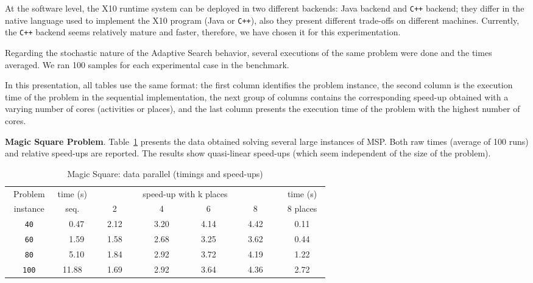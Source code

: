 \documentclass{llncs}
\newcommand{\BL}{\vspace{\baselineskip}}
\begin{document}
At the software level, the X10 runtime system can be deployed in two
different backends: Java backend and \texttt{C++} backend; they differ
in the native language used to implement the X10 program (Java or
\texttt{C++}), also they present different trade-offs on different
machines. Currently, the \texttt{C++} backend seems relatively mature
and faster, therefore, we have chosen it for this experimentation.

Regarding the stochastic nature of the Adaptive Search behavior,
several executions of the same problem were done and the times
averaged.  We ran 100 samples for each experimental case in the
benchmark.

In this presentation, all tables use the same format: the first column
identifies the problem instance, the second column is the execution
time of the problem in the sequential implementation, the next group
of columns contains the corresponding speed-up obtained with a varying
number of cores (activities or places), and the last column presents
the execution time of the problem with the highest number of cores.


\BL \noindent \textbf{Magic Square
  Problem}. Table~\ref{tab:MagicSquareResult} presents the data
obtained solving several large instances of MSP. Both raw times
(average of 100 runs) and relative speed-ups are reported. The results
show quasi-linear speed-ups (which seem independent of the size of the
problem).

\begin{table}[htb]
  \begin{center}
  \begin{tabular}{||c|c|c|c|c|c|c||}
    \hline
    ~Problem~ & time (s) & \multicolumn{4}{|c|}{speed-up with k places}  & time (s) \\
    \cline{3-6}
    instance  & seq.     & ~~~~2~~~~ & ~~~~4~~~~ & ~~~~6~~~~ & ~~~~8~~~~ &~8 places~\\
    \hline
    \hline
    \texttt{40} & ~~0.47 & 2.12 & 3.20 & 4.14 & 4.42 & 0.11 \\
    \texttt{60} & ~~1.59 & 1.58 & 2.68 & 3.25 & 3.62 & 0.44 \\
    \texttt{80} & ~~5.10 & 1.84 & 2.92 & 3.72 & 4.19 & 1.22 \\
    \texttt{100}&  11.88 & 1.69 & 2.92 & 3.64 & 4.36 & 2.72 \\
    \hline
  \end{tabular}
  \end{center}
  \caption{Magic Square: data parallel (timings and speed-ups)}
  \label{tab:MagicSquareResult}
\end{table}
\end{document}
